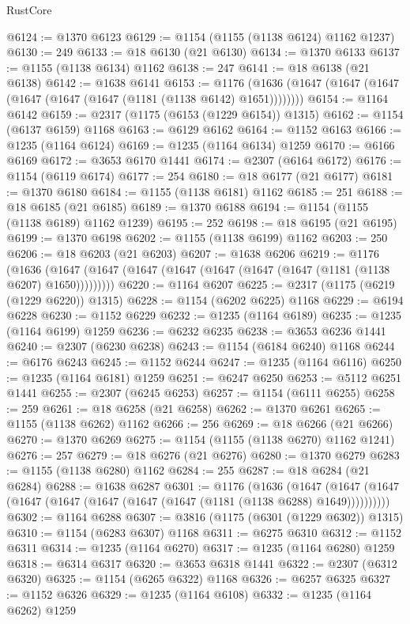 \begin{lexlean}{RustCore}
\begin{coremodule}
@6124 := @1370 @6123
@6129 := @1154 (@1155 (@1138 @6124) @1162 @1237)
@6130 := 249
@6133 := @18 @6130 (@21 @6130)
@6134 := @1370 @6133
@6137 := @1155 (@1138 @6134) @1162
@6138 := 247
@6141 := @18 @6138 (@21 @6138)
@6142 := @1638 @6141
@6153 := @1176 (@1636 (@1647 (@1647 (@1647 (@1647 (@1647 (@1647 (@1181 (@1138 @6142) @1651))))))))
@6154 := @1164 @6142
@6159 := @2317 (@1175 (@6153 (@1229 @6154)) @1315)
@6162 := @1154 (@6137 @6159) @1168
@6163 := @6129 @6162
@6164 := @1152 @6163
@6166 := @1235 (@1164 @6124)
@6169 := @1235 (@1164 @6134) @1259
@6170 := @6166 @6169
@6172 := @3653 @6170 @1441
@6174 := @2307 (@6164 @6172)
@6176 := @1154 (@6119 @6174)
@6177 := 254
@6180 := @18 @6177 (@21 @6177)
@6181 := @1370 @6180
@6184 := @1155 (@1138 @6181) @1162
@6185 := 251
@6188 := @18 @6185 (@21 @6185)
@6189 := @1370 @6188
@6194 := @1154 (@1155 (@1138 @6189) @1162 @1239)
@6195 := 252
@6198 := @18 @6195 (@21 @6195)
@6199 := @1370 @6198
@6202 := @1155 (@1138 @6199) @1162
@6203 := 250
@6206 := @18 @6203 (@21 @6203)
@6207 := @1638 @6206
@6219 := @1176
    (@1636 (@1647 (@1647 (@1647 (@1647 (@1647 (@1647 (@1647 (@1181 (@1138 @6207) @1650)))))))))
@6220 := @1164 @6207
@6225 := @2317 (@1175 (@6219 (@1229 @6220)) @1315)
@6228 := @1154 (@6202 @6225) @1168
@6229 := @6194 @6228
@6230 := @1152 @6229
@6232 := @1235 (@1164 @6189)
@6235 := @1235 (@1164 @6199) @1259
@6236 := @6232 @6235
@6238 := @3653 @6236 @1441
@6240 := @2307 (@6230 @6238)
@6243 := @1154 (@6184 @6240) @1168
@6244 := @6176 @6243
@6245 := @1152 @6244
@6247 := @1235 (@1164 @6116)
@6250 := @1235 (@1164 @6181) @1259
@6251 := @6247 @6250
@6253 := @5112 @6251 @1441
@6255 := @2307 (@6245 @6253)
@6257 := @1154 (@6111 @6255)
@6258 := 259
@6261 := @18 @6258 (@21 @6258)
@6262 := @1370 @6261
@6265 := @1155 (@1138 @6262) @1162
@6266 := 256
@6269 := @18 @6266 (@21 @6266)
@6270 := @1370 @6269
@6275 := @1154 (@1155 (@1138 @6270) @1162 @1241)
@6276 := 257
@6279 := @18 @6276 (@21 @6276)
@6280 := @1370 @6279
@6283 := @1155 (@1138 @6280) @1162
@6284 := 255
@6287 := @18 @6284 (@21 @6284)
@6288 := @1638 @6287
@6301 := @1176
    (@1636
      (@1647 (@1647 (@1647 (@1647 (@1647 (@1647 (@1647 (@1647 (@1181 (@1138 @6288) @1649))))))))))
@6302 := @1164 @6288
@6307 := @3816 (@1175 (@6301 (@1229 @6302)) @1315)
@6310 := @1154 (@6283 @6307) @1168
@6311 := @6275 @6310
@6312 := @1152 @6311
@6314 := @1235 (@1164 @6270)
@6317 := @1235 (@1164 @6280) @1259
@6318 := @6314 @6317
@6320 := @3653 @6318 @1441
@6322 := @2307 (@6312 @6320)
@6325 := @1154 (@6265 @6322) @1168
@6326 := @6257 @6325
@6327 := @1152 @6326
@6329 := @1235 (@1164 @6108)
@6332 := @1235 (@1164 @6262) @1259

\end{coremodule}
\end{lexlean}
